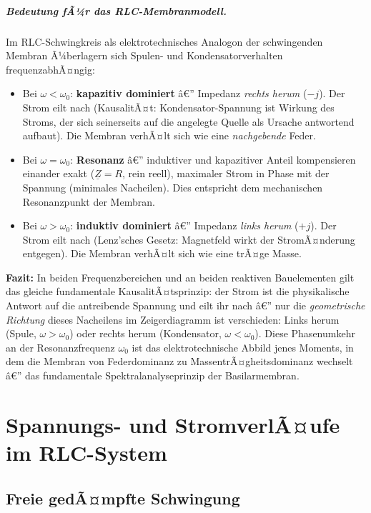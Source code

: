 ﻿\documentclass[12pt,a4paper,titlepage]{report}
\begin{document}
\paragraph{Bedeutung fÃ¼r das RLC-Membranmodell.}
Im RLC-Schwingkreis als elektrotechnisches Analogon der schwingenden Membran
Ã¼berlagern sich Spulen- und Kondensatorverhalten frequenzabhÃ¤ngig:
\begin{itemize}[leftmargin=2em]
	\item Bei $\omega < \omega_0$: \textbf{kapazitiv dominiert} â€”
		Impedanz \emph{rechts herum} ($-j$).
		Der Strom eilt nach (KausalitÃ¤t: Kondensator-Spannung ist Wirkung des Stroms,
		der sich seinerseits auf die angelegte Quelle als Ursache antwortend aufbaut).
		Die Membran verhÃ¤lt sich wie eine \emph{nachgebende} Feder.
	\item Bei $\omega = \omega_0$: \textbf{Resonanz} â€”
		induktiver und kapazitiver Anteil kompensieren einander exakt ($\underline{Z} = R$,
		rein reell), maximaler Strom in Phase mit der Spannung (minimales Nacheilen).
		Dies entspricht dem mechanischen Resonanzpunkt der Membran.
	\item Bei $\omega > \omega_0$: \textbf{induktiv dominiert} â€”
		Impedanz \emph{links herum} ($+j$).
		Der Strom eilt nach (Lenz'sches Gesetz: Magnetfeld wirkt der StromÃ¤nderung entgegen).
		Die Membran verhÃ¤lt sich wie eine trÃ¤ge Masse.
\end{itemize}

\textbf{Fazit:} In beiden Frequenzbereichen und an beiden reaktiven Bauelementen gilt
das gleiche fundamentale KausalitÃ¤tsprinzip: der Strom ist die physikalische Antwort
auf die antreibende Spannung und eilt ihr nach â€” nur die \emph{geometrische Richtung}
dieses Nacheilens im Zeigerdiagramm ist verschieden:
Links herum (Spule, $\omega > \omega_0$) oder rechts herum (Kondensator, $\omega < \omega_0$).
Diese Phasenumkehr an der Resonanzfrequenz $\omega_0$ ist das elektrotechnische Abbild
jenes Moments, in dem die Membran von Federdominanz zu MassentrÃ¤gheitsdominanz
wechselt â€” das fundamentale Spektralanalyseprinzip der Basilarmembran.

\chapter{Spannungs- und StromverlÃ¤ufe im RLC-System}

\section{Freie gedÃ¤mpfte Schwingung}
\end{document}
